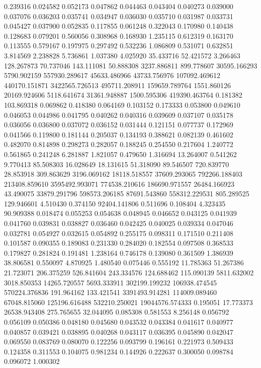 0.239316
0.024582
0.052173
0.047862
0.044463
0.043404
0.040273
0.039000
0.037076
0.036203
0.035741
0.034947
0.036030
0.035710
0.031987
0.033731
0.045427
0.037900
0.052835
0.117855
0.061248
0.322043
0.170980
0.140438
0.128683
0.079201
0.560056
0.308968
0.168930
1.235115
0.612319
0.163170
0.113555
0.579167
0.197975
0.297492
0.532236
1.086809
0.531071
0.632851
3.814569
2.238828
5.736861
1.037380
4.025920
35.433716
52.421572
3.266463
128.267873
70.737046
143.111081
50.888308
3237.886811
899.778607
30595.166293
5790.902159
557930.289617
45633.486966
43733.756976
107092.469612
440170.151871
3422565.726513
495711.208911
159659.789764
1551.860126
20169.924606
5118.641674
31361.948887
1500.595306
419390.463764
0.181382
103.869318
0.069862
0.418380
0.064169
0.103152
0.173333
0.053800
0.049610
0.046053
0.044986
0.041795
0.040262
0.040316
0.039609
0.037107
0.035178
0.036056
0.036800
0.037072
0.036152
0.031444
0.121151
0.077737
0.172969
0.041566
0.119800
0.181144
0.205037
0.134193
0.388621
0.082139
0.461602
0.482070
0.814898
0.298273
0.282057
0.188245
0.254550
0.217604
1.240772
0.561865
0.241248
6.281887
1.821057
0.479650
1.316694
13.264007
0.541262
9.770413
85.508303
16.028649
18.131615
51.318090
89.546507
720.839770
28.853918
309.863629
3196.069162
18118.518557
37609.293065
792266.188403
213408.859610
3595492.993071
774538.210616
186690.971557
26484.166923
43.490075
33879.291796
598573.206185
87691.543860
558312.229531
805.289525
129.946601
4.510430
0.374150
92404.141806
0.511696
0.108404
4.323435
90.909388
0.018474
0.055253
0.054638
0.048945
0.046652
0.043125
0.041939
0.041760
0.039831
0.038827
0.036460
0.042425
0.040025
0.039334
0.047046
0.032781
0.054927
0.032615
0.054892
0.255175
0.098311
0.171510
0.211408
0.101587
0.090355
0.189083
0.231330
0.284020
0.182554
0.097508
0.368533
0.179827
0.281824
0.191481
1.238164
0.746178
0.139080
0.361509
1.386939
38.806581
0.550097
4.870925
1.480540
0.075446
0.555192
11.785363
51.267386
21.723071
206.375259
526.841604
243.334576
124.688462
115.090139
5811.632002
3018.850353
14265.720557
5693.333911
302199.199232
106938.474545
570224.376836
191.964162
133.421541
3391493.914281
114009.089460
67048.815060
125196.616488
532210.250021
19044576.574333
0.195051
17.773373
26538.943408
275.765655
32.044095
0.085308
0.581553
8.256148
0.056792
0.056109
0.050386
0.048180
0.045680
0.043532
0.043384
0.041617
0.040977
0.040857
0.039421
0.038895
0.040268
0.043117
0.036395
0.045890
0.042047
0.069550
0.083769
0.080070
0.122256
0.093799
0.196161
0.221973
0.509433
0.124358
0.311553
0.104075
0.981234
0.144926
0.222637
0.300050
0.098784
0.096072
1.000302
